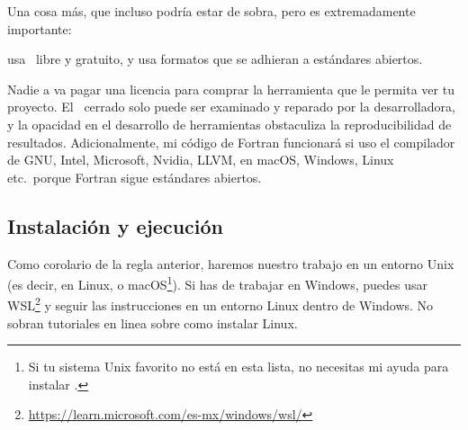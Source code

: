 Una cosa más, que incluso podría estar de sobra, pero es extremadamente importante:
\begin{Center}
  usa \software~libre y gratuito, y usa formatos que se adhieran a estándares abiertos.
\end{Center}
Nadie a va pagar una licencia para comprar la herramienta que le permita ver tu proyecto.
El \software~cerrado solo puede ser examinado y reparado por la desarrolladora, y
la opacidad en el desarrollo de herramientas obstaculiza la reproducibilidad de
resultados. Adicionalmente, mi código de Fortran funcionará si uso el compilador de GNU,
Intel, Microsoft, Nvidia, LLVM, en macOS, Windows, Linux etc.\ porque Fortran sigue estándares
abiertos.

\subsection{Instalación y ejecución}

Como corolario de la regla anterior, haremos nuestro trabajo en un entorno Unix
(es decir, en Linux, o macOS\footnote{
  Si tu sistema Unix favorito no está en esta lista, no necesitas mi ayuda para instalar
  \software.
}). Si has de trabajar en Windows, puedes usar WSL\footnote{
  \url{https://learn.microsoft.com/es-mx/windows/wsl/}
} y seguir las instrucciones en un entorno Linux dentro de Windows. No sobran tutoriales
en linea sobre como instalar Linux.

